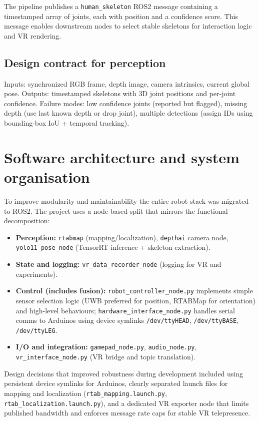 The pipeline publishes a \texttt{human\_skeleton} ROS2 message containing a timestamped array of joints, each with position and a confidence score. This message enables downstream nodes to select stable skeletons for interaction logic and VR rendering.

\subsection*{Design contract for perception}
Inputs: synchronized RGB frame, depth image, camera intrinsics, current global pose.
Outputs: timestamped skeletons with 3D joint positions and per-joint confidence.
Failure modes: low confidence joints (reported but flagged), missing depth (use last known depth or drop joint), multiple detections (assign IDs using bounding-box IoU + temporal tracking).

\section{Software architecture and system organisation}

To improve modularity and maintainability the entire robot stack was migrated to ROS2. The project uses a node-based split that mirrors the functional decomposition:

\begin{itemize}
	\item \textbf{Perception:} \texttt{rtabmap} (mapping/localization), \texttt{depthai} camera node, \linebreak\texttt{yolo11\_pose\_node} (TensorRT inference + skeleton extraction).
	\item \textbf{State and logging:} \texttt{vr\_data\_recorder\_node} (logging for VR and experiments).
	\item \textbf{Control (includes fusion):} \texttt{robot\_controller\_node.py} implements simple sensor selection logic (UWB preferred for position, RTABMap for orientation) and high-level behaviours; \texttt{hardware\_interface\_node.py} handles serial comms to Arduinos using device symlinks \texttt{/dev/ttyHEAD}, \texttt{/dev/ttyBASE}, \texttt{/dev/ttyLEG}.
	\item \textbf{I/O and integration:} \texttt{gamepad\_node.py}, \texttt{audio\_node.py}, \texttt{vr\_interface\_node.py} (VR bridge and topic translation).
\end{itemize}

Design decisions that improved robustness during development included using persistent device symlinks for Arduinos, clearly separated launch files for mapping and localization (\texttt{rtab\_mapping.launch.py}, \texttt{rtab\_localization.launch.py}), and a dedicated VR exporter node that limits published bandwidth and enforces message rate caps for stable VR telepresence.

